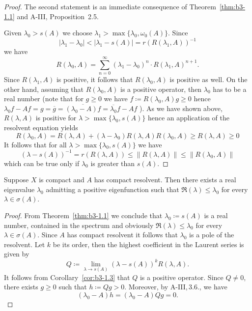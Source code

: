 \begin{proof}
	The second statement is an immediate consequence of Theorem~\ref{thm:b3-1.1} and A-III, Proposition~2.5.
	
	Given $\lambda_0 > s(A)$ we choose $\lambda_1 > \max\{\lambda_0,\omega_{0}(A)\}$.
	Since 
	\[
	\text{$|\lambda_1 - \lambda_0| < |\lambda_1 - s(A)| = r(R(\lambda_1,A))^{-1}$}
	\]
	we have
	\begin{equation}\label{eq:b3-1.10}
		R(\lambda_0,A) = \sum_{n=0}^{\infty} (\lambda_1 - \lambda_0)^n \cdot R(\lambda_1,A)^{n+1}.
	\end{equation}
	Since $R(\lambda_1,A)$ is positive, it follows that $R(\lambda_0,A)$ is positive as well.
	On the other hand, assuming that $R(\lambda_0,A)$ is a positive operator, then $\lambda_0$ has to be a real number (note that for $g \geq 0$ we have $f \coloneqq R(\lambda_0,A)g \geq 0$ hence $\lambda_0f - Af = g = \overline{g} = \overline{(\lambda_0 - A)f} = \overline{\lambda_0}f - Af$ ).
	As we have shown above, $R(\lambda,A)$ is positive for $\lambda > \max\{\lambda_0,s(A)\}$ hence an application of the resolvent equation yields
	\begin{equation}\label{eq:b3-1.11}
		R(\lambda_0,A) = R(\lambda,A) + (\lambda - \lambda_0)R(\lambda,A)R(\lambda_0,A) \geq R(\lambda,A) \geq 0
	\end{equation}
	It follows that for all $\lambda > \max\{\lambda_{0},s(A)\}$ we have
	\begin{equation}\label{eq:b3-1.12}
		(\lambda - s(A))^{-1} = r(R(\lambda,A)) \leq \|R(\lambda,A)\| \leq \|R(\lambda_{0},A)\|
	\end{equation}
	which can be true only if $\lambda_{0}$ is greater than $s(A)$.
\end{proof}
\begin{corollary}\label{cor:b3-1.4}
Suppose $X$ is compact and $A$ has compact resolvent.	
	Then there exists a real eigenvalue $\lambda_{0}$ admitting a positive eigenfunction such that 
	$\Re(\lambda) \leq \lambda_{0}$ for every $\lambda \in \sigma(A)$.
\end{corollary}
\begin{proof}
	From Theorem~\ref{thm:b3-1.1} we conclude that $\lambda_{0} \coloneqq s(A)$ is a real number, contained in the spectrum and obviously $\Re(\lambda) \leq \lambda_{0}$ for every $\lambda \in \sigma(A)$.
	Since $A$ has compact resolvent it follows that $\lambda_{0}$ is a pole of the resolvent.
	Let $k$ be its order, then the highest coefficient in the Laurent series is given by
	\begin{equation}\label{eq:b3-1.13}
		Q \coloneqq \lim_{\lambda \to s(A)} (\lambda - s(A))^{k}R(\lambda,A).
	\end{equation}
It follows from Corollary~\ref{cor:b3-1.3} that $Q$ is a positive operator.
Since $Q \neq 0$, there exists $g \geq 0$ such that $h \coloneqq Qg > 0$.
Moreover, by A-III,\,3.6., we have 
%
\[
	 (\lambda_{0} - A)h = (\lambda_{0} - A)Qg = 0 .
\]
%
\end{proof}
